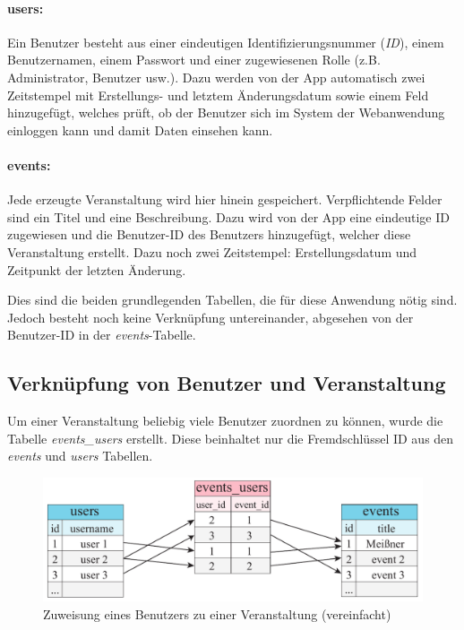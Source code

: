 \paragraph{users:}
Ein Benutzer besteht aus einer eindeutigen Identifizierungsnummer (\emph{ID}), einem Benutzernamen, einem Passwort und einer zugewiesenen Rolle (z.B. Administrator, Benutzer usw.). Dazu werden von der App automatisch zwei Zeitstempel mit Erstellungs- und letztem Änderungsdatum sowie einem Feld hinzugefügt, welches prüft, ob der Benutzer sich im System der Webanwendung einloggen kann und damit Daten einsehen kann.

\paragraph{events:}
Jede erzeugte Veranstaltung wird hier hinein gespeichert. Verpflichtende Felder sind ein Titel und eine Beschreibung. Dazu wird von der App eine eindeutige ID zugewiesen und die Benutzer-ID des Benutzers hinzugefügt, welcher diese Veranstaltung erstellt. Dazu noch zwei Zeitstempel: Erstellungsdatum und Zeitpunkt der letzten Änderung.\par

Dies sind die beiden grundlegenden Tabellen, die für diese Anwendung nötig sind. Jedoch besteht noch keine Verknüpfung untereinander, abgesehen von der Benutzer-ID in der \emph{events}-Tabelle.

\subsection{Verknüpfung von Benutzer und Veranstaltung}
Um einer Veranstaltung beliebig viele Benutzer zuordnen zu können, wurde die Tabelle \emph{events\_users} erstellt. Diese beinhaltet nur die Fremdschlüssel ID aus den \emph{events} und \emph{users} Tabellen.

\begin{figure}[!ht]
	\centering
	\includegraphics[width=15cm]{fig/events_users}
	\caption[Zuweisung eines Benutzers zu einer Veranstaltung]{Zuweisung eines Benutzers zu einer Veranstaltung (vereinfacht)}
\end{figure}

